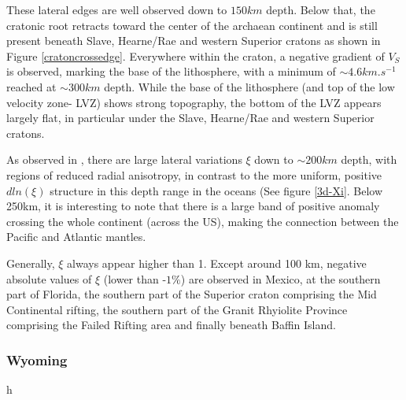\documentclass[12pt]{article}
\begin{document}
These lateral edges are well observed down to $150km$ depth. Below that, the cratonic root retracts toward the center of the archaean continent and is still present beneath Slave, Hearne/Rae and western Superior cratons as shown in Figure \ref{cratoncrossedge}. 
Everywhere within the craton, a negative gradient of $V_S$ is observed, marking the base of the lithosphere, with a minimum of $\sim 4.6km.s^{-1}$ reached at $\sim 300km$ depth. 
While the base of the lithosphere (and top of the low velocity zone- LVZ) shows strong topography, the bottom of the LVZ appears largely flat, in particular under the  Slave, Hearne/Rae and western Superior cratons.

As observed in \cite{babuvska1998age,gung2003global,yuan2014lithospheric}, there are large lateral variations  $\xi$ down to $\sim 200km$ depth, with regions of reduced radial anisotropy, in contrast to the more uniform, positive $dln(\xi)$ structure in this depth range in the oceans (See figure \ref{3d-Xi}. 
Below 250km, it is interesting to note that there is a large band of positive anomaly crossing the whole continent (across the US), making the connection between the Pacific and Atlantic mantles.

Generally, $\xi$ always appear higher than 1. 
Except around 100 km, negative absolute values of $\xi$ (lower than -$1\%$) are observed in Mexico, at the southern part of Florida, the southern part of the Superior craton comprising the Mid Continental rifting, the southern part of the Granit Rhyiolite Province comprising the Failed Rifting area and finally beneath Baffin Island. 


\subsubsection{Wyoming}{h}


\end{document}
